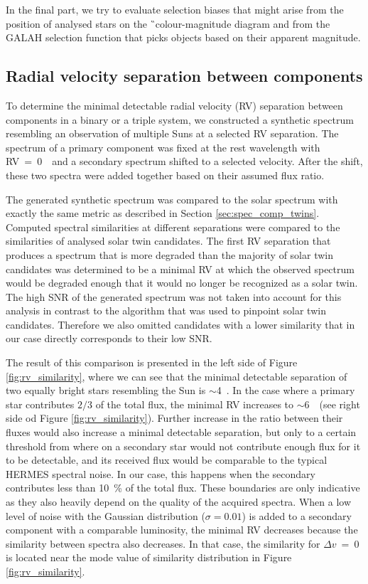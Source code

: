 In the final part, we try to evaluate selection biases that might arise from the position of analysed stars on the \G\ colour-magnitude diagram and from the GALAH selection function that picks objects based on their apparent magnitude.

\subsection{Radial velocity separation between components}
\label{sec:rv_sep_sim}
To determine the minimal detectable radial velocity (RV) separation between components in a binary or a triple system, we constructed a synthetic spectrum resembling an observation of multiple Suns at a selected RV separation. The spectrum of a primary component was fixed at the rest wavelength with RV~=~0~\kms\ and a secondary spectrum shifted to a selected velocity. After the shift, these two spectra were added together based on their assumed flux ratio. 

The generated synthetic spectrum was compared to the solar spectrum with exactly the same metric as described in Section \ref{sec:spec_comp_twins}. Computed spectral similarities at different separations were compared to the similarities of analysed solar twin candidates. The first RV separation that produces a spectrum that is more degraded than the majority of solar twin candidates was determined to be a minimal RV at which the observed spectrum would be degraded enough that it would no longer be recognized as a solar twin. The high SNR of the generated spectrum was not taken into account for this analysis in contrast to the algorithm that was used to pinpoint solar twin candidates. Therefore we also omitted candidates with a lower similarity that in our case directly corresponds to their low SNR. 

The result of this comparison is presented in the left side of Figure \ref{fig:rv_similarity}, where we can see that the minimal detectable separation of two equally bright stars resembling the Sun is $\sim$4~\kms. In the case where a primary star contributes $2/3$ of the total flux, the minimal RV increases to $\sim$6~\kms\ (see right side od Figure \ref{fig:rv_similarity}). Further increase in the ratio between their fluxes would also increase a minimal detectable separation, but only to a certain threshold from where on a secondary star would not contribute enough flux for it to be detectable, and its received flux would be comparable to the typical HERMES spectral noise. In our case, this happens when the secondary contributes less than 10~\% of the total flux. These boundaries are only indicative as they also heavily depend on the quality of the acquired spectra. When a low level of noise with the Gaussian distribution ($\sigma=0.01$) is added to a secondary component with a comparable luminosity, the minimal RV decreases because the similarity between spectra also decreases. In that case, the similarity for $\Delta v$~=~0 is located near the mode value of similarity distribution in Figure \ref{fig:rv_similarity}. 

